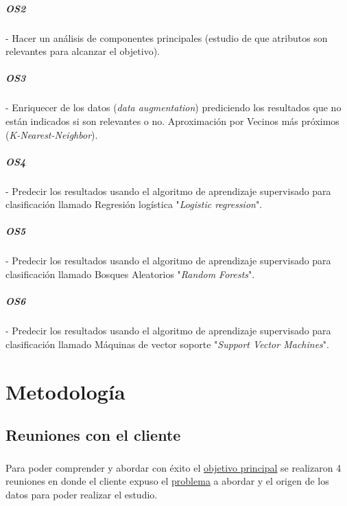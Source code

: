 \documentclass[10pt,a4paper,oneside]{book}
\begin{document}
\label{os:OS2}
\paragraph{OS2} - Hacer un análisis de componentes principales (estudio de que atributos son relevantes para alcanzar el objetivo).

\label{os:OS3}
\paragraph{OS3} - Enriquecer de los datos (\textit{data augmentation}) prediciendo los resultados que no están indicados si son relevantes o no. Aproximación por Vecinos más próximos (\textit{K-Nearest-Neighbor}).

\label{os:OS4}
\paragraph{OS4} - Predecir los resultados usando el algoritmo de aprendizaje supervisado para clasificación llamado Regresión logística "\textit{Logistic regression}".

\label{os:OS5}
\paragraph{OS5} - Predecir los resultados usando el algoritmo de aprendizaje supervisado para clasificación llamado Bosques Aleatorios "\textit{Random Forests}".

\label{os:OS6}
\paragraph{OS6} - Predecir los resultados usando el algoritmo de aprendizaje supervisado para clasificación llamado Máquinas de vector soporte "\textit{Support Vector Machines}".

\chapter{Metodología}

\section{Reuniones con el cliente}

\paragraph{}
Para poder comprender y abordar con éxito el \hyperref[op:OP1]{objetivo principal} se realizaron 4 reuniones en donde el cliente expuso el \hyperref[op:OP1]{problema} a abordar y el origen de los datos para poder realizar el estudio.
\end{document}
